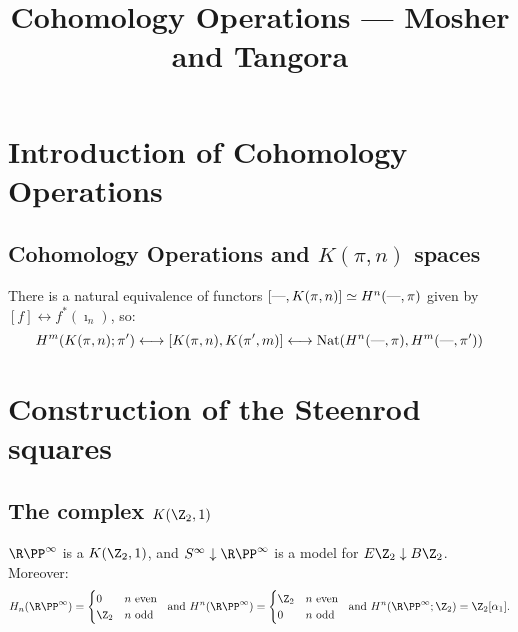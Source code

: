 \documentclass[11pt]{article}
\title{Cohomology Operations\small{ --- Mosher and Tangora}}
\author{}
\date{}
\newcommand{\DASH}{\textup{---}}
\theoremstyle{plain}
\theoremstyle{definition}
\newcommand{\RP}{{\R\PP}}
\begin{document}
\tableofcontents

\section{Introduction of Cohomology Operations}
\subsection{Cohomology Operations and $K(\pi,n)$ spaces}
There is a natural equivalence of functors $[\DASH,K(\pi,n)]\simeq H^n(\DASH,\pi)$ given by $[f]\longleftrightarrow f^*(\imath_n)$, so:
\[H^m(K(\pi,n);\pi')\longleftrightarrow [K(\pi,n),K(\pi',m)]\longleftrightarrow \textup{Nat}( H^n(\DASH,\pi), H^{m}(\DASH,\pi'))\]



\section{Construction of the Steenrod squares}
\subsection{The complex $K(\Z_2,1)$}
$\RP^\infty$ is a $K(\Z_2,1)$, and $S^\infty\downarrow\RP^\infty$ is a model for $E\Z_2\downarrow B\Z_2$. Moreover:
\[H_n(\RP^\infty)=\begin{cases}0&n\text{ even}\\\Z_2&n\text{ odd}\end{cases}\ \text{ and }H^n(\RP^\infty)=\begin{cases}\Z_2&n\text{ even}\\0&n\text{ odd}\end{cases}\ \text{ and }H^n(\RP^\infty;\Z_2)=\Z_2[\alpha_1].\]
\end{document}

